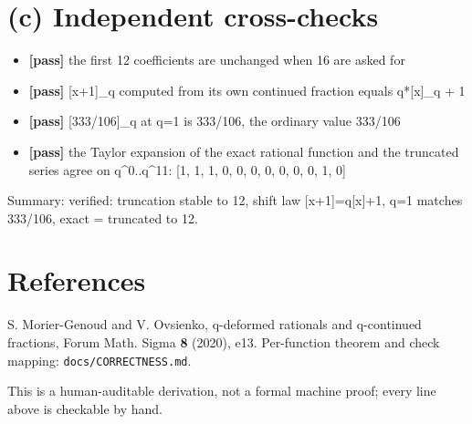 \documentclass[11pt]{article}
\begin{document}
\section*{(c) Independent cross-checks}
\begin{itemize}
\item \textbf{[pass]} the first 12 coefficients are unchanged when 16 are asked for
\item \textbf{[pass]} [x+1]\_q computed from its own continued fraction equals q*[x]\_q + 1
\item \textbf{[pass]} [333/106]\_q at q=1 is 333/106, the ordinary value 333/106
\item \textbf{[pass]} the Taylor expansion of the exact rational function and the truncated series agree on q\textasciicircum{}0..q\textasciicircum{}11: [1, 1, 1, 0, 0, 0, 0, 0, 0, 0, 1, 0]
\end{itemize}
Summary: verified: truncation stable to 12, shift law [x+1]=q[x]+1, q=1 matches 333/106, exact = truncated to 12.

\section*{References}
S. Morier-Genoud and V. Ovsienko, q-deformed rationals and q-continued
fractions, Forum Math. Sigma \textbf{8} (2020), e13. Per-function theorem and
check mapping: \texttt{docs/CORRECTNESS.md}.

\medskip
\noindent This is a human-auditable derivation, not a formal machine proof;
every line above is checkable by hand.
\end{document}
